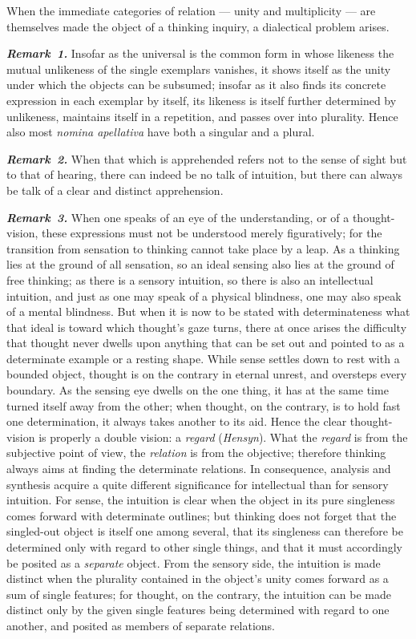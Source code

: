 \documentclass[12pt]{book}
\newcommand{\anm}[1]{\emph{\textbf{Remark~#1.}}}
\begin{document}
When the immediate categories of relation --- unity and multiplicity --- are
themselves made the object of a thinking inquiry, a dialectical problem
arises.

\anm{1} Insofar as the universal is the common form in whose likeness the
mutual unlikeness of the single exemplars vanishes, it shows itself as the
unity under which the objects can be subsumed; insofar as it also finds its
concrete expression in each exemplar by itself, its likeness is itself
further determined by unlikeness, maintains itself in a repetition, and
passes over into plurality. Hence also most \textit{nomina apellativa} have
both a singular and a plural.

\anm{2} When that which is apprehended refers not to the sense of sight but
to that of hearing, there can indeed be no talk of intuition, but there can
always be talk of a clear and distinct apprehension.

\anm{3} When one speaks of an eye of the understanding, or of a
thought-vision, these expressions must not be understood merely figuratively;
for the transition from sensation to thinking cannot take place by a leap.
As a thinking lies at the ground of all sensation, so an ideal sensing also
lies at the ground of free thinking; as there is a sensory intuition, so
there is also an intellectual intuition, and just as one may speak of a
physical blindness, one may also speak of a mental blindness. But when it is
now to be stated with determinateness what that ideal is toward which
thought's gaze turns, there at once arises the difficulty that thought never
dwells upon anything that can be set out and pointed to as a determinate
example or a resting shape. While sense settles down to rest with a bounded
object, thought is on the contrary in eternal unrest, and oversteps every
boundary. As the sensing eye dwells on the one thing, it has at the same
time turned itself away from the other; when thought, on the contrary, is to
hold fast one determination, it always takes another to its aid. Hence the
clear thought-vision is properly a double vision: a \emph{regard}
(\textit{Hensyn}). What the \emph{regard} is from the subjective point of
view, the \emph{relation} is from the objective; therefore thinking always
aims at finding the determinate relations. In consequence, analysis and
synthesis acquire a quite different significance for intellectual than for
sensory intuition. For sense, the intuition is clear when the object in its
pure singleness comes forward with determinate outlines; but thinking does
not forget that the singled-out object is itself one among several, that its
singleness can therefore be determined only with regard to other single
things, and that it must accordingly be posited as a \emph{separate} object.
From the sensory side, the intuition is made distinct when the plurality
contained in the object's unity comes forward as a sum of single features;
for thought, on the contrary, the intuition can be made distinct only by the
given single features being determined with regard to one another, and
posited as members of separate relations.
\end{document}
